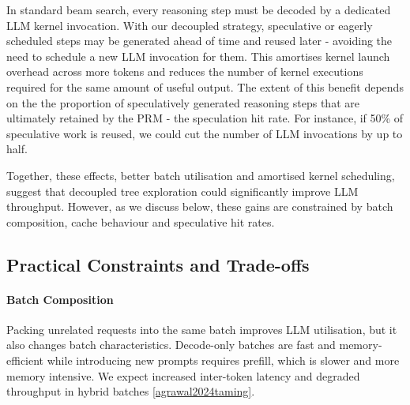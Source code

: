 \documentclass[12pt,twoside]{report}
\begin{document}
In standard beam search, every reasoning step must be decoded by a dedicated LLM kernel invocation. 
With our decoupled strategy, speculative or eagerly scheduled steps may be generated ahead of time and reused later - avoiding the need to schedule a new LLM invocation for them. 
This amortises kernel launch overhead across more tokens and reduces the number of kernel executions required for the same amount of useful output. 
The extent of this benefit depends on the the proportion of speculatively generated reasoning steps that are ultimately retained by the PRM - the speculation hit rate. 
For instance, if 50\% of speculative work is reused, we could cut the number of LLM invocations by up to half.

\vspace{0.5em}
Together, these effects, better batch utilisation and amortised kernel scheduling, suggest that decoupled tree exploration could significantly improve LLM throughput. 
However, as we discuss below, these gains are constrained by batch composition, cache behaviour and speculative hit rates.

\subsection{Practical Constraints and Trade-offs}

\paragraph{Batch Composition}

Packing unrelated requests into the same batch improves LLM utilisation, but it also changes batch characteristics. 
Decode-only batches are fast and memory-efficient while introducing new prompts requires prefill, which is slower and more memory intensive. 
We expect increased inter-token latency and degraded throughput in hybrid batches \ref{agrawal2024taming}. 

\end{document}

